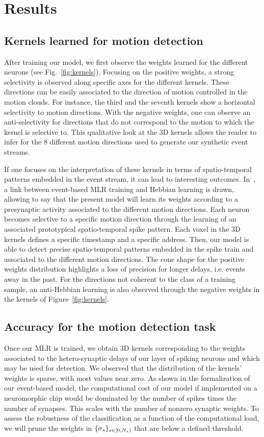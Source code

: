 \documentclass[default]{sn-jnl}%
\theoremstyle{thmstyleone}%
\theoremstyle{thmstyletwo}%
\theoremstyle{thmstylethree}%
\newcommand{\seeFig}[1]{see Fig.~\ref{fig:#1}}%
\begin{document}
\section{Results}
\label{sec:results}
%
\subsection{Kernels learned for motion detection}
%
After training our model, we first observe the weights learned for the different neurons (\seeFig{kernels}). Focusing on the positive weights, a strong selectivity is observed along specific axes for the different kernels. These directions can be easily associated to the direction of motion controlled in the motion clouds. For instance, the third and the seventh kernels show a horizontal selectivity to motion directions.
%
With the negative weights, one can observe an anti-selectivity for directions that do not correspond to the motion to which the kernel is selective to. This qualitative look at the 3D kernels allows the reader to infer for the $8$ different motion directions used to generate our synthetic event streams.

If one focuses on the interpretation of these kernels in terms of spatio-temporal patterns embedded in the event stream, it can lead to interesting outcomes. In~\citep{grimaldi_robust_2022}, a link between event-based MLR training and Hebbian learning is drawn, allowing to say that the present model will learn its weights according to a presynaptic activity associated to the different motion directions. Each neuron becomes selective to a specific motion direction through the learning of an associated prototypical spatio-temporal spike pattern. Each voxel in the 3D kernels defines a specific timestamp and a specific address. Then, our model is able to detect precise spatio-temporal patterns embedded in the spike train and associated to the different motion directions. The cone shape for the positive weights distribution highlights a loss of precision for longer delays, i.e. events away in the past. For the directions not coherent to the class of a training sample, an anti-Hebbian learning is also observed through the negative weights in the kernels of Figure~\ref{fig:kernels}. 
%
\subsection{Accuracy for the motion detection task}
%
Once our MLR is trained, we obtain 3D kernels corresponding to the weights associated to the hetero-synaptic delays of our layer of spiking neurons and which may be used for detection. We observed that the distribution of the kernels' weights is sparse, with most values near zero. As shown in the formalization of our event-based model, the computational cost of our model if implemented on a neuromorphic chip would be dominated by the number of spikes times the number of synapses. This scales with the number of nonzero synaptic weights. To  assess the robustness of the classification as a function of the computational load, we will prune the weights in $\{\sigma_s\}_{s \in [0,N_{s})}$ that are below a defined threshold. 
\end{document}
